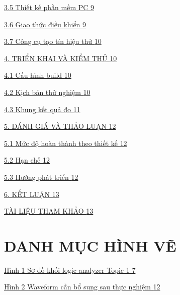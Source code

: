 \hyperref[thiux1ebft-kux1ebf-phux1ea7n-mux1ec1m-pc]{3.5 Thiết kế phần mềm PC \hyperref[thiux1ebft-kux1ebf-phux1ea7n-mux1ec1m-pc]{9}}

\hyperref[giao-thux1ee9c-ux111iux1ec1u-khiux1ec3n]{3.6 Giao thức điều khiển \hyperref[giao-thux1ee9c-ux111iux1ec1u-khiux1ec3n]{9}}

\hyperref[cuxf4ng-cux1ee5-tux1ea1o-tuxedn-hiux1ec7u-thux1eed]{3.7 Công cụ tạo tín hiệu thử \hyperref[cuxf4ng-cux1ee5-tux1ea1o-tuxedn-hiux1ec7u-thux1eed]{10}}

\hyperref[triux1ec3n-khai-vuxe0-kiux1ec3m-thux1eed]{4. TRIỂN KHAI VÀ KIỂM THỬ \hyperref[triux1ec3n-khai-vuxe0-kiux1ec3m-thux1eed]{10}}

\hyperref[cux1ea5u-huxecnh-build]{4.1 Cấu hình build \hyperref[cux1ea5u-huxecnh-build]{10}}

\hyperref[kux1ecbch-bux1ea3n-thux1eed-nghiux1ec7m]{4.2 Kịch bản thử nghiệm \hyperref[kux1ecbch-bux1ea3n-thux1eed-nghiux1ec7m]{10}}

\hyperref[khung-kux1ebft-quux1ea3-ux111o]{4.3 Khung kết quả đo \hyperref[khung-kux1ebft-quux1ea3-ux111o]{11}}

\hyperref[ux111uxe1nh-giuxe1-vuxe0-thux1ea3o-luux1eadn]{5. ĐÁNH GIÁ VÀ THẢO LUẬN \hyperref[ux111uxe1nh-giuxe1-vuxe0-thux1ea3o-luux1eadn]{12}}

\hyperref[mux1ee9c-ux111ux1ed9-houxe0n-thuxe0nh-theo-thiux1ebft-kux1ebf]{5.1 Mức độ hoàn thành theo thiết kế \hyperref[mux1ee9c-ux111ux1ed9-houxe0n-thuxe0nh-theo-thiux1ebft-kux1ebf]{12}}

\hyperref[hux1ea1n-chux1ebf]{5.2 Hạn chế \hyperref[hux1ea1n-chux1ebf]{12}}

\hyperref[hux1b0ux1edbng-phuxe1t-triux1ec3n]{5.3 Hướng phát triển \hyperref[hux1b0ux1edbng-phuxe1t-triux1ec3n]{12}}

\hyperref[kux1ebft-luux1eadn]{6. KẾT LUẬN \hyperref[kux1ebft-luux1eadn]{13}}

\hyperref[tuxe0i-liux1ec7u-tham-khux1ea3o]{TÀI LIỆU THAM KHẢO \hyperref[tuxe0i-liux1ec7u-tham-khux1ea3o]{13}}

\chapter{DANH MỤC HÌNH VẼ}\label{danh-mux1ee5c-huxecnh-vux1ebd}

\hyperref[_Toc234276623]{Hình 1 Sơ đồ khối logic analyzer Topic 1 \hyperref[_Toc234276623]{7}}

\hyperref[_Toc234276624]{Hình 2 Waveform cần bổ sung sau thực nghiệm \hyperref[_Toc234276624]{12}}

